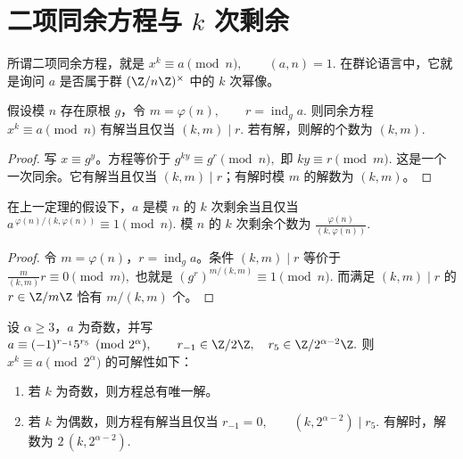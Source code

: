 \section{二项同余方程与 $k$ 次剩余}

所谓二项同余方程，就是
\(
  x^k\equiv a\pmod n,\qquad (a,n)=1.
\)
在群论语言中，它就是询问 $a$ 是否属于群 $\U n$ 中的 $k$ 次幂像。

\begin{theorem}[循环情形的判别]
假设模 $n$ 存在原根 $g$，令
\(
  m=\varphi(n),\qquad r=\operatorname{ind}_g a.
\)
则同余方程
\(
  x^k\equiv a\pmod n
\)
有解当且仅当
\(
  (k,m)\mid r.
\)
若有解，则解的个数为
\(
  (k,m).
\)
\end{theorem}

\begin{proof}
写 $x\equiv g^y$。方程等价于
\(
  g^{ky}\equiv g^r\pmod n,
\)
即
\(
  ky\equiv r\pmod m.
\)
这是一个一次同余。它有解当且仅当 $(k,m)\mid r$；有解时模 $m$ 的解数为 $(k,m)$。
\end{proof}

\begin{corollary}[循环情形的指数判别]
在上一定理的假设下，$a$ 是模 $n$ 的 $k$ 次剩余当且仅当
\(
  a^{\,\varphi(n)/(k,\varphi(n))}\equiv 1\pmod n.
\)
模 $n$ 的 $k$ 次剩余个数为
\(
  \frac{\varphi(n)}{(k,\varphi(n))}.
\)
\end{corollary}

\begin{proof}
令 $m=\varphi(n)$，$r=\operatorname{ind}_g a$。条件 $(k,m)\mid r$ 等价于
\(
  \frac{m}{(k,m)}r\equiv 0\pmod m,
\)
也就是
\(
  (g^r)^{m/(k,m)}\equiv 1\pmod n.
\)
而满足 $(k,m)\mid r$ 的 $r\in\Z/m\Z$ 恰有 $m/(k,m)$ 个。
\end{proof}

\begin{theorem}
设 $\alpha\ge3$，$a$ 为奇数，并写
\(
  a\equiv (-1)^{r_{-1}}5^{r_5}\pmod {2^\alpha},
  \qquad
  r_{-1}\in\Cyc2,\quad r_5\in\Cyc{2^{\alpha-2}}.
\)
则
\(
  x^k\equiv a\pmod {2^\alpha}
\)
的可解性如下：

\begin{enumerate}[label=(\roman*),leftmargin=*]
  \item 若 $k$ 为奇数，则方程总有唯一解。
  \item 若 $k$ 为偶数，则方程有解当且仅当
  \(
    r_{-1}=0,\qquad
    (k,2^{\alpha-2})\mid r_5.
  \)
  有解时，解数为
  \(
    2\,(k,2^{\alpha-2}).
  \)
\end{enumerate}
\end{theorem}

